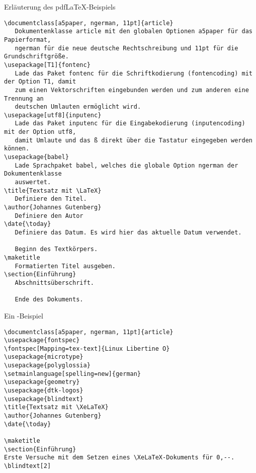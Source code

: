 \begin{frame}[fragile]{Erläuterung des pdf\LaTeX{}-Beispiels}
\begin{lstlisting}[style=tex, basicstyle=\tiny]
\documentclass[a5paper, ngerman, 11pt]{article}
   Dokumentenklasse article mit den globalen Optionen a5paper für das Papierformat, 
   ngerman für die neue deutsche Rechtschreibung und 11pt für die Grundschriftgröße.
\usepackage[T1]{fontenc}
   Lade das Paket fontenc für die Schriftkodierung (fontencoding) mit der Option T1, damit 
   zum einen Vektorschriften eingebunden werden und zum anderen eine Trennung an 
   deutschen Umlauten ermöglicht wird.
\usepackage[utf8]{inputenc}
   Lade das Paket inputenc für die Eingabekodierung (inputencoding) mit der Option utf8, 
   damit Umlaute und das ß direkt über die Tastatur eingegeben werden können.
\usepackage{babel}
   Lade Sprachpaket babel, welches die globale Option ngerman der Dokumentenklasse 
   auswertet.
\title{Textsatz mit \LaTeX}
   Definiere den Titel.
\author{Johannes Gutenberg}
   Definiere den Autor
\date{\today}
   Definiere das Datum. Es wird hier das aktuelle Datum verwendet.

   Beginn des Textkörpers.
\maketitle
   Formatierten Titel ausgeben.
\section{Einführung}
   Abschnittsüberschrift.

   Ende des Dokuments.
\end{lstlisting}
\end{frame}

\begin{frame}[fragile]{Ein \XeLaTeX{}-Beispiel}
\begin{lstlisting}[style=tex]
%% Ein xelatex-Beispiel
\documentclass[a5paper, ngerman, 11pt]{article}
\usepackage{fontspec}
\fontspec[Mapping=tex-text]{Linux Libertine O}
\usepackage{microtype}
\usepackage{polyglossia}
\setmainlanguage[spelling=new]{german}
\usepackage{geometry}
\usepackage{dtk-logos}
\usepackage{blindtext}
\title{Textsatz mit \XeLaTeX}
\author{Johannes Gutenberg}
\date{\today}

\maketitle
\section{Einführung}
Erste Versuche mit dem Setzen eines \XeLaTeX-Dokuments für 0,--.
\blindtext[2]

\end{lstlisting}
\end{frame}


